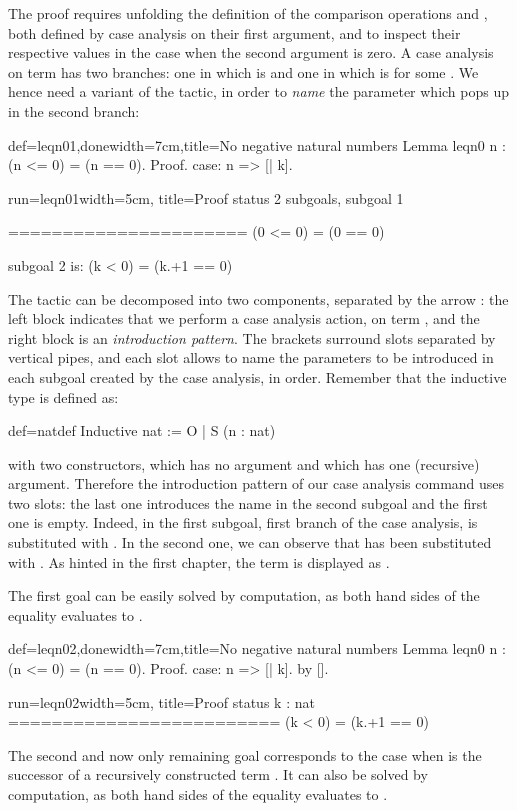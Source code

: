 The proof requires unfolding the definition of the comparison operations
\C{<=} and \C{==}, both defined by case analysis on their first
argument, and to inspect their respective values in the case when the
second argument is zero. A case analysis on term  has two
branches: one in which  is  and one in which  is
 for some . We hence need a variant of the 
tactic, in order to \emph{name} the parameter  which pops up in
the second branch:

\begin{coq}{def=leqn01,done}{width=7cm,title=No negative natural numbers}
Lemma leqn0 n : (n <= 0) = (n == 0).
Proof.
case: n => [| k].
\end{coq}
\begin{coqout}{run=leqn01}{width=5cm, title=Proof status}
2 subgoals, subgoal 1

======================
  (0 <= 0) = (0 == 0)

subgoal 2 is:
 (k < 0) = (k.+1 == 0)
\end{coqout}
The tactic   can be decomposed into two components,
separated by the arrow \C{=>}: the left block  indicates
that we  perform a case analysis action, on term , and the right
block \C{[|k]} is an \emph{introduction pattern}. The brackets
surround slots separated by vertical pipes, and each slot allows to
name the parameters to be introduced in each subgoal created by the
case analysis, in order. Remember that the inductive type  is
defined as:

\begin{coq}{def=natdef}{}
Inductive nat := O | S (n : nat)
\end{coq}
with two constructors,  which has no argument and  which has
one (recursive) argument. Therefore the introduction pattern \C{[|k]}
of our case analysis command uses two slots: the last one introduces
the name  in the second subgoal and the first one is
empty. Indeed, in the first subgoal, first branch of the case
analysis,  is substituted with . In the second one, we can
observe that  has been substituted with . 
As hinted in the first chapter, the term 
is displayed as .

The first goal
can be easily solved by computation, as both hand sides of the equality
evaluates to .

\begin{coq}{def=leqn02,done}{width=7cm,title=No negative natural numbers}
Lemma leqn0 n : (n <= 0) = (n == 0).
Proof.
case: n => [| k].
  by [].
\end{coq}
\begin{coqout}{run=leqn02}{width=5cm, title=Proof status}
k : nat
=========================
  (k < 0) = (k.+1 == 0)
\end{coqout}
\index[ssr]{\C{=> [$\mid$m]}}
The second and now only remaining goal corresponds to the case when
 is the successor  of a recursively constructed term
.
It can also be  solved by computation, as both hand sides
of the equality evaluates to .

